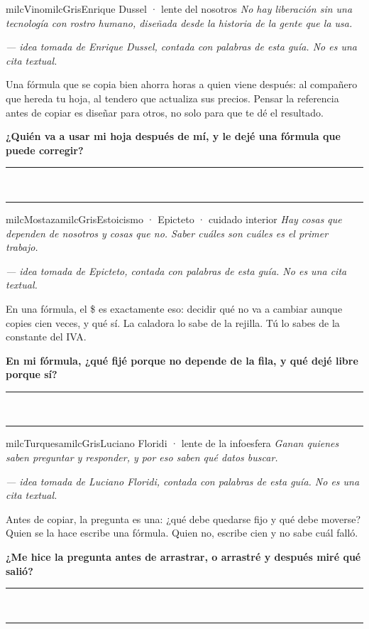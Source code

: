 \documentclass[11pt,letterpaper]{article}
\newcommand{\linead}[1]{\noindent\color{milcLinea}\rule{#1}{0.5pt}\color{milcNegro}}
\begin{document}
\begin{softbox}{milcVino}{milcGris}{Enrique Dussel · lente del nosotros}
\textit{No hay liberación sin una tecnología con rostro humano, diseñada desde la historia de la gente que la usa.}

{\footnotesize\itshape\color{milcNegro!70}--- idea tomada de Enrique Dussel, contada con palabras de esta guía. No es una cita textual.}

Una fórmula que se copia bien ahorra horas a quien viene después: al compañero que hereda tu hoja, al tendero que actualiza sus precios. Pensar la referencia antes de copiar es diseñar para otros, no solo para que te dé el resultado.

\textbf{¿Quién va a usar mi hoja después de mí, y le dejé una fórmula que puede corregir?}
\end{softbox}
\linead{\linewidth}\\[1mm]
\linead{\linewidth}

\begin{softbox}{milcMostaza}{milcGris}{Estoicismo · Epicteto · cuidado interior}
\textit{Hay cosas que dependen de nosotros y cosas que no. Saber cuáles son cuáles es el primer trabajo.}

{\footnotesize\itshape\color{milcNegro!70}--- idea tomada de Epicteto, contada con palabras de esta guía. No es una cita textual.}

En una fórmula, el \$ es exactamente eso: decidir qué no va a cambiar aunque copies cien veces, y qué sí. La caladora lo sabe de la rejilla. Tú lo sabes de la constante del IVA.

\textbf{En mi fórmula, ¿qué fijé porque no depende de la fila, y qué dejé libre porque sí?}
\end{softbox}
\linead{\linewidth}\\[1mm]
\linead{\linewidth}

\begin{softbox}{milcTurquesa}{milcGris}{Luciano Floridi · lente de la infoesfera}
\textit{Ganan quienes saben preguntar y responder, y por eso saben qué datos buscar.}

{\footnotesize\itshape\color{milcNegro!70}--- idea tomada de Luciano Floridi, contada con palabras de esta guía. No es una cita textual.}

Antes de copiar, la pregunta es una: ¿qué debe quedarse fijo y qué debe moverse? Quien se la hace escribe una fórmula. Quien no, escribe cien y no sabe cuál falló.

\textbf{¿Me hice la pregunta antes de arrastrar, o arrastré y después miré qué salió?}
\end{softbox}
\linead{\linewidth}\\[1mm]
\linead{\linewidth}
\end{document}
